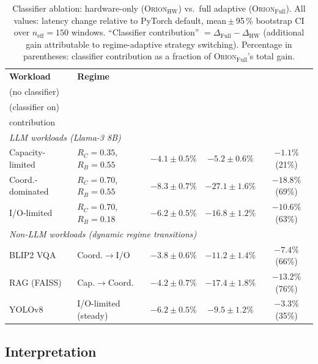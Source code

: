 \begin{table}[h]
\centering
\caption{Classifier ablation: hardware-only (\textsc{Orion}$_{\mathrm{HW}}$)
vs.\ full adaptive (\textsc{Orion}$_{\mathrm{Full}}$).
All values: latency change relative to PyTorch default,
mean\,$\pm$\,95\,\% bootstrap CI over $n_{\mathrm{eff}}\!=\!150$ windows.
``Classifier contribution'' $= \Delta_{\mathrm{Full}} - \Delta_{\mathrm{HW}}$
(additional gain attributable to regime-adaptive strategy switching).
Percentage in parentheses: classifier contribution as a fraction of
\textsc{Orion}$_{\mathrm{Full}}$'s total gain.}
\label{tab:classifier_ablation}
\renewcommand{\arraystretch}{1.25}
\footnotesize
\begin{tabular}{llccc}
\toprule
\textbf{Workload} & \textbf{Regime} &
  \makecell{\textbf{\textsc{Orion}$_{\mathrm{HW}}$}\\(no classifier)} &
  \makecell{\textbf{\textsc{Orion}$_{\mathrm{Full}}$}\\(classifier on)} &
  \makecell{\textbf{Classifier}\\contribution} \\
\midrule
\multicolumn{5}{l}{\textit{LLM workloads (Llama-3 8B)}} \\
\quad Capacity-limited    & $R_C{=}0.35$, $R_B{=}0.55$
  & $-4.1 \pm 0.5\%$ & $-5.2 \pm 0.6\%$  & $-1.1\%$ (21\%) \\
\quad Coord.-dominated    & $R_C{=}0.70$, $R_B{=}0.55$
  & $-8.3 \pm 0.7\%$ & $-27.1 \pm 1.6\%$ & $-18.8\%$ (69\%) \\
\quad I/O-limited         & $R_C{=}0.70$, $R_B{=}0.18$
  & $-6.2 \pm 0.5\%$ & $-16.8 \pm 1.2\%$ & $-10.6\%$ (63\%) \\
\midrule
\multicolumn{5}{l}{\textit{Non-LLM workloads (dynamic regime transitions)}} \\
\quad BLIP2 VQA           & Coord.$\to$I/O
  & $-3.8 \pm 0.6\%$ & $-11.2 \pm 1.4\%$ & $-7.4\%$  (66\%) \\
\quad RAG (FAISS)         & Cap.$\to$Coord.
  & $-4.2 \pm 0.7\%$ & $-17.4 \pm 1.8\%$ & $-13.2\%$ (76\%) \\
\quad YOLOv8              & I/O-limited (steady)
  & $-6.2 \pm 0.5\%$ & $-9.5 \pm 1.2\%$  & $-3.3\%$  (35\%) \\
\bottomrule
\end{tabular}
\end{table}

\subsection{Interpretation}

